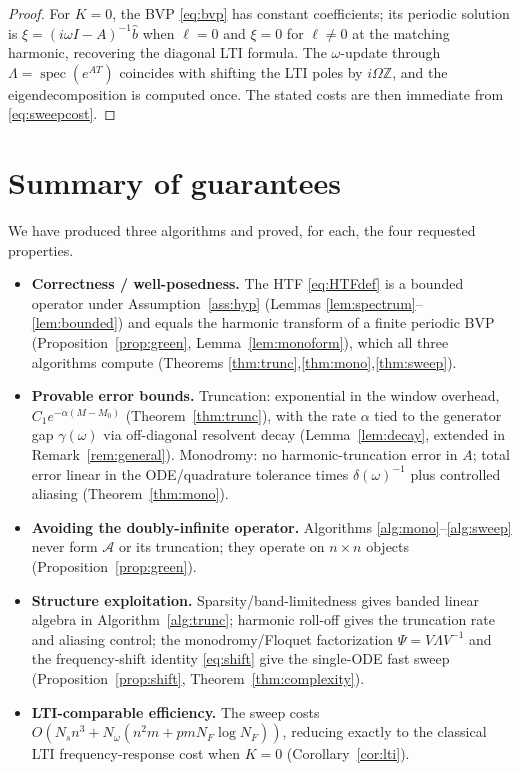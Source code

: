 \documentclass{amsart}
\theoremstyle{definition}
\DeclareMathOperator{\spec}{spec}
\newcommand{\Z}{\mathbb{Z}}
\newcommand{\Acal}{\mathcal{A}}
\begin{document}
\begin{proof}
For $K=0$, the BVP \eqref{eq:bvp} has constant coefficients; its periodic
solution is $\xi=(i\omega I-A)^{-1}\hat b$ when $\ell=0$ and $\xi=0$ for
$\ell\ne0$ at the matching harmonic, recovering the diagonal LTI formula. The
$\omega$-update through $\Lambda=\spec(e^{AT})$ coincides with shifting the LTI
poles by $i\Omega\Z$, and the eigendecomposition is computed once. The stated
costs are then immediate from \eqref{eq:sweepcost}.
\end{proof}

\section{Summary of guarantees}

We have produced three algorithms and proved, for each, the four requested
properties.
\begin{itemize}
\item \textbf{Correctness / well-posedness.} The HTF \eqref{eq:HTFdef} is a
bounded operator under Assumption~\ref{ass:hyp} (Lemmas
\ref{lem:spectrum}--\ref{lem:bounded}) and equals the harmonic transform of a
finite periodic BVP (Proposition~\ref{prop:green}, Lemma~\ref{lem:monoform}),
which all three algorithms compute (Theorems
\ref{thm:trunc},\ref{thm:mono},\ref{thm:sweep}).
\item \textbf{Provable error bounds.} Truncation: exponential in the window
overhead, $C_1 e^{-\alpha(M-M_0)}$ (Theorem~\ref{thm:trunc}), with the rate
$\alpha$ tied to the generator gap $\gamma(\omega)$ via off-diagonal resolvent
decay (Lemma~\ref{lem:decay}, extended in Remark~\ref{rem:general}). Monodromy:
no harmonic-truncation error in $A$; total error linear in the ODE/quadrature
tolerance times $\delta(\omega)^{-1}$ plus controlled aliasing
(Theorem~\ref{thm:mono}).
\item \textbf{Avoiding the doubly-infinite operator.} Algorithms
\ref{alg:mono}--\ref{alg:sweep} never form $\Acal$ or its truncation; they
operate on $n\times n$ objects (Proposition~\ref{prop:green}).
\item \textbf{Structure exploitation.} Sparsity/band-limitedness gives banded
linear algebra in Algorithm~\ref{alg:trunc}; harmonic roll-off gives the
truncation rate and aliasing control; the monodromy/Floquet factorization
$\Psi=V\Lambda V^{-1}$ and the frequency-shift identity \eqref{eq:shift} give the
single-ODE fast sweep (Proposition~\ref{prop:shift},
Theorem~\ref{thm:complexity}).
\item \textbf{LTI-comparable efficiency.} The sweep costs
$O(N_s n^3 + N_\omega(n^2m + pmN_F\log N_F))$, reducing exactly to the classical
LTI frequency-response cost when $K=0$ (Corollary~\ref{cor:lti}).
\end{itemize}
\end{document}
